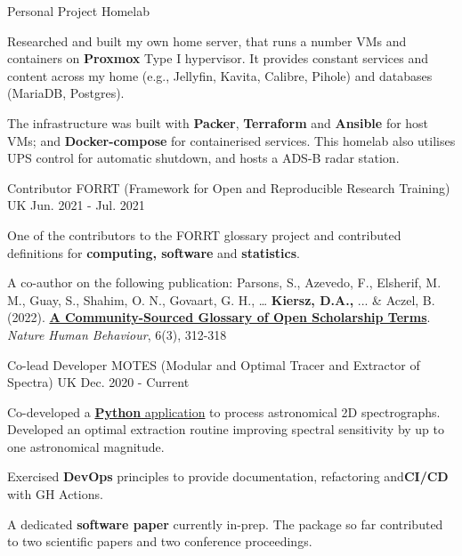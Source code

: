 
\begin{cventries}
   	
  \cventry
   	{Personal Project}
    {Homelab}
    {} %
    {} %
    {
     \begin{cvitems} 
     	\item Researched and built my own home server, that runs a number VMs and containers on \textbf{Proxmox} Type I hypervisor. It provides constant services and content across my home (e.g., Jellyfin, Kavita, Calibre, Pihole) and databases (MariaDB, Postgres). 
     	\item The infrastructure was built with \textbf{Packer}, \textbf{Terraform} and \textbf{Ansible} for host VMs; and \textbf{Docker-compose} for containerised services. This homelab also utilises UPS control for automatic shutdown, and hosts a ADS-B radar station.
     \end{cvitems}
     }
     
    \cventry
    {Contributor} %
    {FORRT (Framework for Open and Reproducible Research Training)} %
    {UK} %
    {Jun. 2021 - Jul. 2021} %
    {
      \begin{cvitems} %
		\item One of the contributors to the FORRT glossary project and contributed definitions for \textbf{computing, software} and \textbf{statistics}. 
		\item A co-author on the following publication: Parsons, S., Azevedo, F., Elsherif, M. M., Guay, S., Shahim, O. N., Govaart, G. H., … \textbf{Kiersz, D.A.,} ... \& Aczel, B. (2022). \textbf{\href{https://www.nature.com/articles/s41562-021-01269-4}{A Community-Sourced Glossary of Open Scholarship Terms}}. \textit{Nature Human Behaviour}, 6(3), 312-318
      \end{cvitems}
    }

    \cventry
    {Co-lead Developer} %
    {MOTES (Modular and Optimal Tracer and Extractor of Spectra)} %
    {UK} %
    {Dec. 2020 - Current} %
    {
      \begin{cvitems} %
        \item Co-developed a \href{https://github.com/tseccull/motes}{\textbf{Python} application} to process astronomical 2D spectrographs. Developed an optimal extraction routine improving spectral sensitivity by up to one astronomical magnitude.
        \item Exercised \textbf{DevOps} principles to provide documentation, refactoring and\textbf{CI/CD} with GH Actions.
        \item A dedicated \textbf{software paper} currently in-prep. The package so far contributed to two scientific papers and two conference proceedings.
      \end{cvitems}
    }


\end{cventries}
